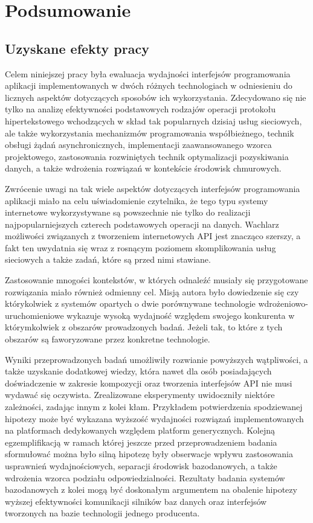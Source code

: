\chapter{Podsumowanie}
\section{Uzyskane efekty pracy}
Celem niniejszej pracy była ewaluacja wydajności interfejsów programowania aplikacji implementowanych w dwóch różnych technologiach w odniesieniu do licznych aspektów dotyczących sposobów ich wykorzystania. Zdecydowano się nie tylko na analizę efektywności podstawowych rodzajów operacji protokołu hipertekstowego wchodzących w skład tak popularnych dzisiaj usług sieciowych, ale także wykorzystania mechanizmów programowania współbieżnego, technik obsługi żądań asynchronicznych, implementacji zaawansowanego wzorca projektowego, zastosowania rozwiniętych technik optymalizacji pozyskiwania danych, a także wdrożenia rozwiązań w kontekście środowisk chmurowych.

Zwrócenie uwagi na tak wiele aspektów dotyczących interfejsów programowania aplikacji miało na celu uświadomienie czytelnika, że tego typu systemy internetowe wykorzystywane są powszechnie nie tylko do realizacji najpopularniejszych czterech podstawowych operacji na danych. Wachlarz możliwości związanych z tworzeniem internetowych API jest znacząco szerszy, a fakt ten uwydatnia się wraz z rosnącym poziomem skomplikowania usług sieciowych a także zadań, które są przed nimi stawiane.

Zastosowanie mnogości kontekstów, w których odnaleźć musiały się przygotowane rozwiązania miało również odmienny cel. Misją autora było dowiedzenie się czy którykolwiek z systemów opartych o dwie porównywane technologie wdrożeniowo-uruchomieniowe wykazuje wysoką wydajność względem swojego konkurenta w którymkolwiek z obszarów prowadzonych badań. Jeżeli tak, to które z tych obszarów są faworyzowane przez konkretne technologie.

Wyniki przeprowadzonych badań umożliwiły rozwianie powyższych wątpliwości, a także uzyskanie dodatkowej wiedzy, która nawet dla osób posiadających doświadczenie w zakresie kompozycji oraz tworzenia interfejsów API nie musi wydawać się oczywista. Zrealizowane eksperymenty uwidoczniły niektóre zależności, zadając innym z kolei kłam. Przykładem potwierdzenia spodziewanej hipotezy może być wykazana wyższość wydajności rozwiązań implementowanych na platformach dedykowanych względem platform generycznych. Kolejną egzemplifikacją w ramach której jeszcze przed przeprowadzeniem badania sformułować można było silną hipotezę były obserwacje wpływu zastosowania usprawnień wydajnościowych, separacji środowisk bazodanowych, a także wdrożenia wzorca podziału odpowiedzialności. Rezultaty badania systemów bazodanowych z kolei mogą być doskonałym argumentem na obalenie hipotezy wyższej efektywności komunikacji silników baz danych oraz interfejsów tworzonych na bazie technologii jednego producenta.

